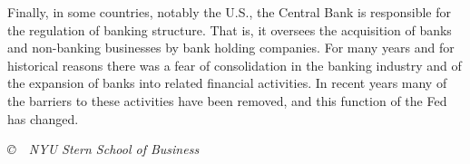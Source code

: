 \documentclass[letterpaper,12pt]{article}
\begin{document}
Finally, in some countries, notably the U.S., the Central Bank is
responsible for the regulation of banking structure. That is, it
oversees the acquisition of banks and non-banking businesses by bank
holding companies. For many years and for historical reasons there
was a fear of consolidation in the banking industry and of the
expansion of banks into related financial activities. In recent
years many of the barriers to these activities have been removed,
and this function of the Fed has changed.












%



\vfill \centerline{\it \copyright \ \number\year \ NYU Stern
School of Business}
\end{document}
